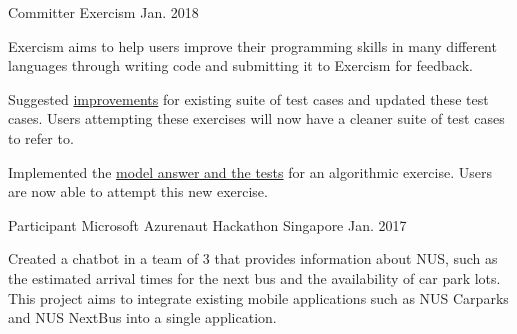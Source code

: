 

\begin{cventries}


  \cventry
    {Committer} %
    {Exercism} %
    {} %
    {Jan. 2018} %
    {
      \begin{cvitems} %
        \item {Exercism aims to help users improve their programming skills in many different languages through writing code and submitting it to Exercism for feedback.}
        \item {Suggested \href{https://github.com/issues?utf8=\%E2\%9C\%93&q=repo\%3Aexercism\%2Fproblem-specifications+involves\%3AZhiyuan-Amos}{improvements} for existing suite of test cases and updated these test cases. Users attempting these exercises will now have a cleaner suite of test cases to refer to.}
        \item {Implemented the \href{https://github.com/issues?utf8=\%E2\%9C\%93&q=repo\%3Aexercism\%2Fjava+involves\%3AZhiyuan-Amos}{model answer and the tests} for an algorithmic exercise. Users are now able to attempt this new exercise.}
      \end{cvitems}
    }

  \cventry
    {Participant} %
    {Microsoft Azurenaut Hackathon} %
    {Singapore} %
    {Jan. 2017} %
    {
      \begin{cvitems} %
        \item {Created a chatbot in a team of 3 that provides information about NUS, such as the estimated arrival times for the next bus and the availability of car park lots. This project aims to integrate existing mobile applications such as NUS Carparks and NUS NextBus into a single application.}
      \end{cvitems}
    }
    

\end{cventries}
